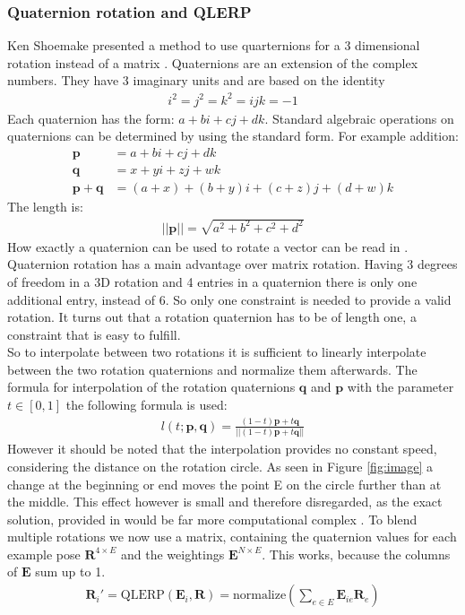 \subsubsection{Quaternion rotation and QLERP}
Ken Shoemake presented a method to use quarternions for a 3 dimensional rotation instead of a matrix \cite{Quat}.
Quaternions are an extension of the complex numbers. They have 3 imaginary units and are based on the identity
\begin{align}
i^2=j^2=k^2=ijk=-1
\end{align}
Each quaternion has the form: $a+ bi+cj+dk$.
Standard algebraic operations on quaternions can be determined by using the standard form. For example addition:
\begin{align}
\bm p &= a+ bi+cj+dk\\
\bm q &= x+ yi + zj+wk\\
\bm p+ \bm q &= (a+ x) + (b+y)i + (c+z)j + (d+w)k
\end{align}
The length is:
\begin{align}
||\bm p|| = \sqrt{a^2+b^2+c^2+d^2}
\end{align}
How exactly a quaternion can be used to rotate a vector can be read in \cite{Quat}.\\
Quaternion rotation has a main advantage over matrix rotation. Having 3 degrees of freedom in a 3D rotation and 4 entries in a quaternion there is only one additional entry, instead of 6. So only one constraint is needed to provide a valid rotation. It turns out that a rotation quaternion has to be of length one, a constraint that is easy to fulfill.\\
So to interpolate between two rotations it is sufficient to linearly interpolate between the two rotation quaternions and normalize them afterwards. \cite{QLERP}
The formula for interpolation of the rotation quaternions $\bm q$ and $\bm p$ with the parameter $t \in[0,1]$ the following formula is used:
\begin{align}
l(t;\bm{p},\bm{q}) = \frac{(1-t)\bm{p} + t\bm{q}}{||(1-t)\bm{p} + t\bm{q}||}
\end{align}
However it should be noted that the interpolation provides no constant speed, considering the distance on the rotation circle. As seen in Figure \ref{fig:image} a change at the beginning or end moves the point E on the circle further than at the middle. This effect however is small and therefore disregarded, as the exact solution, provided in \cite{Quat} would be far more computational complex \cite{QLERP}.
To blend multiple rotations we now use a matrix, containing the quaternion values for each example pose $\bm{R}^{4\times E}$ and the weightings $\bm{E}^{N\times E}$. This works, because the columns of $\bm{E}$ sum up to 1.
\begin{align}
\bm{R}_i' =\text{QLERP} (\bm{E}_i,\bm{R}) = \text{normalize} \left( \sum_{e\in E} \bm{E}_{ie} \bm{R}_{e}\right)
\end{align}


